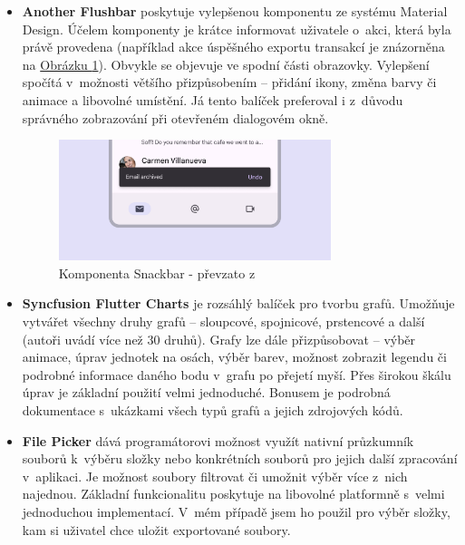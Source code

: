 \documentclass[
  biblatex,
  figures=true,
  tables=false,
  glossaries,
  index
]{kidiplom}
\begin{document}
\begin{itemize}
  \item \textbf{Another Flushbar} \cite{flushbar} poskytuje vylepšenou komponentu  ze systému Material Design. Účelem komponenty je krátce informovat uživatele o~akci, která byla právě provedena (například akce úspěšného exportu transakcí je znázorněna na \hyperref[fig:snackbar]{Obrázku \ref{fig:snackbar}}). Obvykle se objevuje ve spodní části obrazovky. Vylepšení spočítá v~možnosti většího přizpůsobením -- přidání ikony, změna barvy či animace a libovolné umístění. Já tento balíček preferoval i z~důvodu správného zobrazování při otevřeném dialogovém okně.

  \begin{figure}
    \centering
    \includegraphics[width=0.75\textwidth]{images/snackbar.png}
    \caption{Komponenta Snackbar - převzato z~\cite{m3-components}}
    \label{fig:snackbar}
  \end{figure}
      
  \item \textbf{Syncfusion Flutter Charts} \cite{syncfusion-charts} je rozsáhlý balíček pro tvorbu grafů. Umožňuje vytvářet všechny druhy grafů -- sloupcové, spojnicové, prstencové a další (autoři uvádí více než 30 druhů). Grafy lze dále přizpůsobovat -- výběr animace, úprav jednotek na osách, výběr barev, možnost zobrazit legendu či podrobné informace daného bodu v~grafu po přejetí myší. Přes širokou škálu úprav je základní použití velmi jednoduché. Bonusem je podrobná dokumentace s~ukázkami všech typů grafů a jejich zdrojových kódů.
  \item \textbf{File Picker} \cite{file-picker} dává programátorovi možnost využít nativní průzkumník souborů k~výběru složky nebo konkrétních souborů pro jejich další zpracování v~aplikaci. Je možnost soubory filtrovat či umožnit výběr více z~nich najednou. Základní funkcionalitu poskytuje na libovolné platformně s~velmi jednoduchou implementací. V~mém případě jsem ho použil pro výběr složky, kam si uživatel chce uložit exportované soubory. 
\end{itemize}
\end{document}
